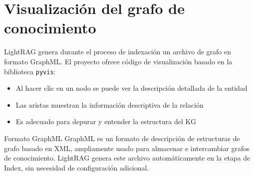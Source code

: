 \section{Visualización del grafo de conocimiento}

LightRAG genera durante el proceso de indexación un archivo de grafo en formato GraphML. El proyecto ofrece código de visualización basado en la biblioteca \texttt{pyvis}:

\begin{itemize}
    \item Al hacer clic en un nodo se puede ver la descripción detallada de la entidad
    \item Las aristas muestran la información descriptiva de la relación
    \item Es adecuado para depurar y entender la estructura del KG
\end{itemize}

\begin{knowledgebox}{Formato GraphML}
GraphML es un formato de descripción de estructuras de grafo basado en XML, ampliamente usado para almacenar e intercambiar grafos de conocimiento. LightRAG genera este archivo automáticamente en la etapa de Index, sin necesidad de configuración adicional.
\end{knowledgebox}


